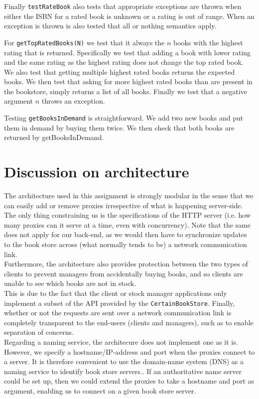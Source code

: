 \documentclass[11pt]{article}
\begin{document}
Finally \texttt{testRateBook} also tests that appropriate exceptions are thrown when either the ISBN for a rated book is unknown or a rating is out of range. When an exception is thrown is also tested that all or nothing semantics apply.

For \texttt{getTopRatedBooks(N)} we test that it always the $n$ books with the highest rating that is returned. Specifically we test that adding a book with lower rating and the same rating as the highest rating does not change the top rated book. We also test that getting multiple highest rated books returns the expected books. We then test that asking for more highest rated books than are present in the bookstore, simply returns a list of all books. Finally we test that a negative argument $n$ throws an exception.

Testing \texttt{getBooksInDemand} is straightforward. We add two new books and put them in demand by buying them twice. We then check that both books are returned by getBooksInDemand.

\section*{Discussion on architecture}

The architecture used in this assignment is strongly modular in the sense that
we can easily add or remove proxies irrespective of what is happening
server-side. The only thing constraining us is the specifications of the HTTP
server (i.e. how many proxies can it serve at a time, even with
concurrency). Note that the same does not apply for our back-end, as we would
then have to synchronize updates to the book store across (what normally
tends to be) a network communication link.\\

Furthermore, the architecture also provides protection between the two types of
clients to prevent managers from accidentally buying books, and so clients are
unable to see which books are not in stock.\\

This is due to the fact that the client or stock manager applications only 
implement a subset of the API provided by the \texttt{CertainBookStore}.
Finally, whether or not the requests are sent over a network communication link
is completely transparent to the end-users (clients and managers), such as to
enable separation of concerns.\\

Regarding a naming service, the architecure does not implement one as it is.
However, we specify a hostname/IP-address and port when the proxies connect
to a server. It is therefore convenient to use the domain-name system
(DNS) as a naming service to identify book store servers.. If an authoritative
name server could be set up, then we could extend the proxies to take a
hostname and port as argument, enabling us to connect on a given book store
server.\\
\end{document}

